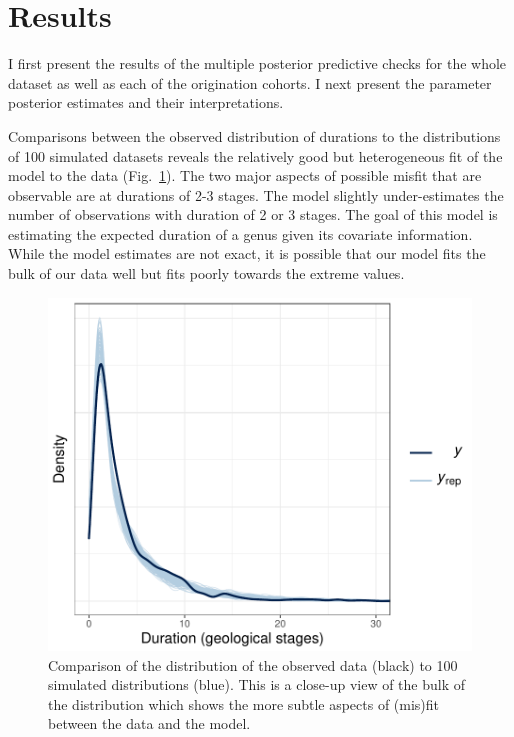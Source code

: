 \documentclass[11pt]{article}
\begin{document}
\section*{Results}
I first present the results of the multiple posterior predictive checks for the whole dataset as well as each of the origination cohorts. I next present the parameter posterior estimates and their interpretations. 


Comparisons between the observed distribution of durations to the distributions of 100 simulated datasets reveals the relatively good but heterogeneous fit of the model to the data (Fig.~\ref{fig:dens_overlay_zoom}). The two major aspects of possible misfit that are observable are at durations of 2-3 stages. The model slightly under-estimates the number of observations with duration of 2 or 3 stages. The goal of this model is estimating the expected duration of a genus given its covariate information. While the model estimates are not exact, it is possible that our model fits the bulk of our data well but fits poorly towards the extreme values.

\begin{figure}[ht]
  \centering
  \includegraphics[height = 0.5\textheight,width=\textwidth,keepaspectratio=true]{figure/ppc_dens_zoom_cweib_cens}
  \caption{ Comparison of the distribution of the observed data (black) to 100 simulated distributions (blue). This is a close-up view of the bulk of the distribution which shows the more subtle aspects of (mis)fit between the data and the model. }
  \label{fig:dens_overlay_zoom}
\end{figure}
\end{document}
